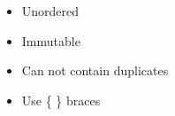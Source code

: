 \begin{itemize}
\begin{itemize}
        \begin{itemize}

          \item Unordered

          \item Immutable

          \item Can not contain duplicates

          \item Use \{ \} braces

        \end{itemize}

    \end{itemize}

\end{itemize}



